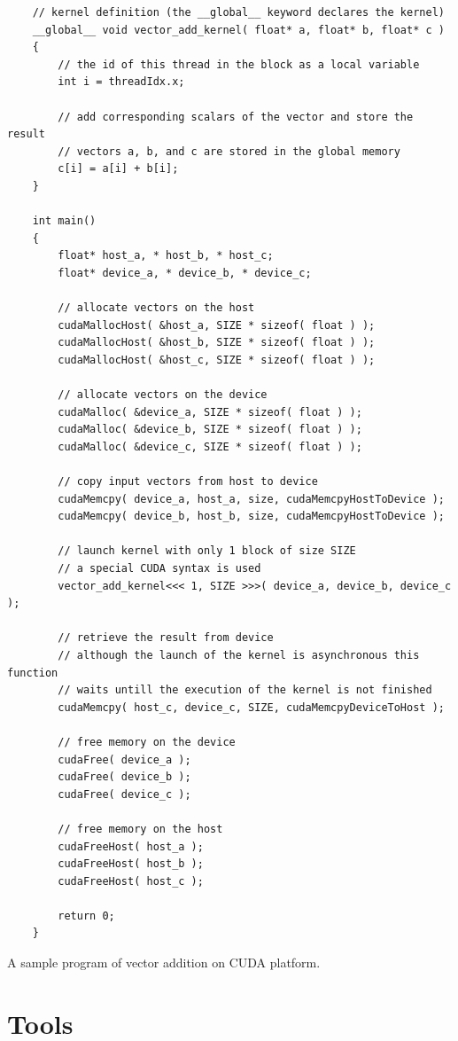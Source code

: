 \documentclass[12pt,twoside]{fithesis2}
\begin{document}
\begin{listing}[h]
	\begin{verbatim}
	// kernel definition (the __global__ keyword declares the kernel)
	__global__ void vector_add_kernel( float* a, float* b, float* c )
	{
		// the id of this thread in the block as a local variable
		int i = threadIdx.x;
		
		// add corresponding scalars of the vector and store the result
		// vectors a, b, and c are stored in the global memory
		c[i] = a[i] + b[i];
	}
	
	int main()
	{
		float* host_a, * host_b, * host_c;
		float* device_a, * device_b, * device_c;
	
		// allocate vectors on the host
		cudaMallocHost( &host_a, SIZE * sizeof( float ) );
		cudaMallocHost( &host_b, SIZE * sizeof( float ) );
		cudaMallocHost( &host_c, SIZE * sizeof( float ) );
		
		// allocate vectors on the device
		cudaMalloc( &device_a, SIZE * sizeof( float ) );
		cudaMalloc( &device_b, SIZE * sizeof( float ) );
		cudaMalloc( &device_c, SIZE * sizeof( float ) );
		
		// copy input vectors from host to device
		cudaMemcpy( device_a, host_a, size, cudaMemcpyHostToDevice );
		cudaMemcpy( device_b, host_b, size, cudaMemcpyHostToDevice );
		
		// launch kernel with only 1 block of size SIZE
		// a special CUDA syntax is used
		vector_add_kernel<<< 1, SIZE >>>( device_a, device_b, device_c );
		
		// retrieve the result from device
		// although the launch of the kernel is asynchronous this function 
		// waits untill the execution of the kernel is not finished
		cudaMemcpy( host_c, device_c, SIZE, cudaMemcpyDeviceToHost );
		
		// free memory on the device
		cudaFree( device_a );
		cudaFree( device_b );
		cudaFree( device_c );
		
		// free memory on the host
		cudaFreeHost( host_a );
		cudaFreeHost( host_b );
		cudaFreeHost( host_c );
		
		return 0;
	}
	\end{verbatim}
	\caption{A sample program of vector addition on CUDA platform.}
	\label{listing:cuda_example}
\end{listing}

\section{Tools}
\end{document}
